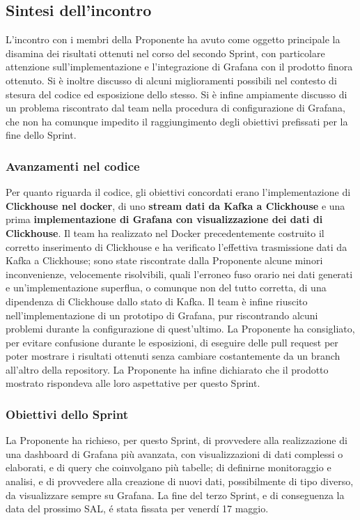 \documentclass[8pt]{article}
\begin{document}
\subsection{Sintesi dell'incontro}
L'incontro con i membri della Proponente ha avuto come oggetto principale la disamina dei risultati
ottenuti nel corso del secondo Sprint, con particolare attenzione sull'implementazione e
l'integrazione di Grafana con il prodotto finora ottenuto. Si è inoltre discusso di alcuni
miglioramenti possibili nel contesto di stesura del codice ed esposizione dello stesso. Si è infine
ampiamente discusso di un problema riscontrato dal team nella procedura di configurazione di
Grafana, che non ha comunque impedito il raggiungimento degli obiettivi prefissati per la fine dello
Sprint.
\subsubsection{Avanzamenti nel codice}
Per quanto riguarda il codice, gli obiettivi concordati erano l'implementazione di
\textbf{Clickhouse nel docker}, di uno \textbf{stream dati da Kafka a Clickhouse} e una prima
\textbf{implementazione di Grafana con visualizzazione dei dati di Clickhouse}. Il team ha
realizzato nel Docker precedentemente costruito il corretto inserimento di Clickhouse e ha
verificato l'effettiva trasmissione dati da Kafka a Clickhouse; sono state riscontrate dalla
Proponente alcune minori inconvenienze, velocemente risolvibili, quali l'erroneo fuso orario nei
dati generati e un'implementazione superflua, o comunque non del tutto corretta, di una dipendenza
di Clickhouse dallo stato di Kafka. Il team è infine riuscito nell'implementazione di un prototipo di Grafana, pur riscontrando alcuni problemi durante la configurazione di quest'ultimo. La Proponente ha consigliato, per evitare confusione durante le esposizioni, di eseguire delle pull request per poter mostrare i risultati ottenuti senza cambiare costantemente da un branch all'altro della repository. La Proponente ha infine dichiarato che il prodotto mostrato rispondeva alle loro aspettative per questo Sprint.
\subsubsection{Obiettivi dello Sprint}
La Proponente ha richieso, per questo Sprint, di provvedere alla realizzazione di una dashboard di
Grafana più avanzata, con visualizzazioni di dati complessi o elaborati, e di query che coinvolgano
più tabelle; di definirne monitoraggio e analisi, e di provvedere alla creazione di nuovi dati,
possibilmente di tipo diverso, da visualizzare sempre su Grafana. La fine del terzo Sprint, e di conseguenza la data del prossimo SAL, é stata fissata per venerdí 17 maggio. 
\end{document}
